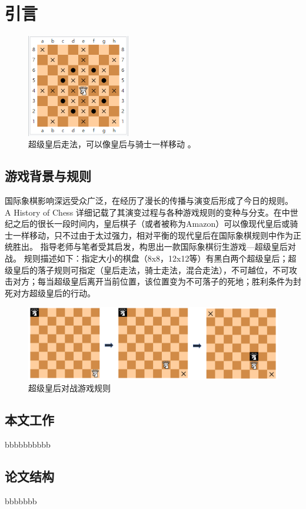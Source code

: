 \chapter{引言}
\label{chap:introduction}

\begin{figure}[htb]
    \centering
    \includegraphics[width=0.4\textwidth]{amazon.PNG}
    \caption[超级皇后]{%
      超级皇后走法，可以像皇后与骑士一样移动%
      \cite{wikiAmazon}。}
    \label{fig:superQueen}
  \end{figure}

\section{游戏背景与规则}
国际象棋影响深远受众广泛，在经历了漫长的传播与演变后形成了今日的规则。
A History of Chess 详细记载了其演变过程与各种游戏规则的变种与分支\cite{murray2015history}。在中世纪之后的很长一段时间内，皇后棋子（或者被称为Amazon）可以像现代皇后或骑士一样移动，只不过由于太过强力，相对平衡的现代皇后在国际象棋规则中作为正统胜出。
指导老师与笔者受其启发，构思出一款国际象棋衍生游戏—超级皇后对战。
规则描述如下：指定大小的棋盘（8x8，12x12等）有黑白两个超级皇后；超级皇后的落子规则可指定（皇后走法，骑士走法，混合走法），不可越位，不可攻击对方；每当超级皇后离开当前位置，该位置变为不可落子的死地；胜利条件为封死对方超级皇后的行动。

\begin{figure}[htb]
    \centering
    \includegraphics[width=1\textwidth]{rules.PNG}
    \caption[游戏规则]{%
      超级皇后对战游戏规则%
      }
    \label{fig:superQueenRules}
  \end{figure}


\section{本文工作}
bbbbbbbbbb
\section{论文结构}
bbbbbbb
